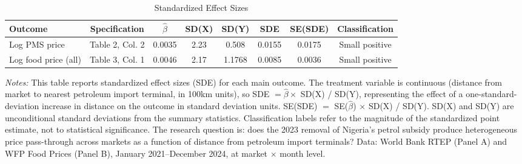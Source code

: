\begin{table}[htbp]
\centering
\caption{Standardized Effect Sizes}
\label{tab:sde}
\begin{adjustbox}{max width=\textwidth}
\begin{tabular}{lccccccc}
\hline\hline
Outcome & Specification & $\hat{\beta}$ & SD(X) & SD(Y) & SDE & SE(SDE) & Classification \\
\hline
Log PMS price & Table 2, Col. 2 & 0.0035 & 2.23 & 0.508 & 0.0155 & 0.0175 & Small positive \\
Log food price (all) & Table 3, Col. 1 & 0.0046 & 2.17 & 1.1768 & 0.0085 & 0.0036 & Small positive \\
\hline\hline
\end{tabular}
\end{adjustbox}
\begin{minipage}{0.95\textwidth}
\small\textit{Notes:} This table reports standardized effect sizes (SDE) for each main outcome. The treatment variable is continuous (distance from market to nearest petroleum import terminal, in 100km units), so SDE $= \hat{\beta} \times$ SD(X) / SD(Y), representing the effect of a one-standard-deviation increase in distance on the outcome in standard deviation units. SE(SDE) $=$ SE($\hat{\beta}$) $\times$ SD(X) / SD(Y). SD(X) and SD(Y) are unconditional standard deviations from the summary statistics. Classification labels refer to the magnitude of the standardized point estimate, not to statistical significance. The research question is: does the 2023 removal of Nigeria's petrol subsidy produce heterogeneous price pass-through across markets as a function of distance from petroleum import terminals? Data: World Bank RTEP (Panel A) and WFP Food Prices (Panel B), January 2021--December 2024, at market $\times$ month level.
\end{minipage}
\end{table}
